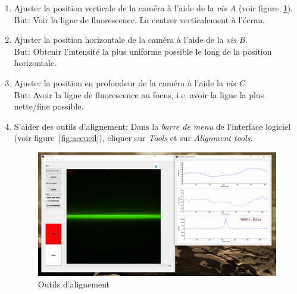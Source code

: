\begin{enumerate}
\begin{figure}[H]
\begin{footnotesize}
\begin{description}[align=right,labelwidth=3cm]
            \end{description} \end{footnotesize}
        \label{fig:vis}
        \end{figure}
    \item Ajuster la position verticale de la caméra à l'aide de la \textit{vis A} (voir figure~\ref{fig:vis}).
    \\ But: Voir la ligne de fluorescence. La centrer verticalement à l'écran.
    \item Ajuster la position horizontale de la caméra à l'aide de la \textit{vis B}.
    \\ But: Obtenir l'intensité la plus uniforme possible le long de la position horizontale.
    \item Ajuster la position en profondeur de la caméra à l'aide la \textit{vis C}.
    \\ But: Avoir la ligne de fluorescence au focus, i.e. avoir la ligne la plus nette/fine possible.
    \item S'aider des outils d'alignement: Dans la \textit{barre de menu} de l'interface logiciel (voir figure~\ref{fig:accueil}), cliquer sur \textit{Tools} et sur \textit{Alignment tools}.
        \begin{figure}[H]
        \centering
        \includegraphics[width=\linewidth]{alignement.PNG}
        \caption{Outils d'alignement}
        \label{fig:alignement}
        \end{figure}
\end{enumerate}
